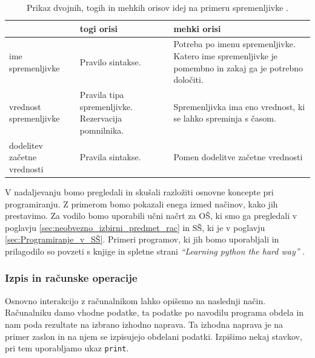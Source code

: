\begin{table}[!h]

\caption{Prikaz dvojnih, togih in mehkih orisov idej na primeru
  spremenljivke \cite{guideTCS}. }
\label{tab:koncept_spremenljivka}
\begin{tabular}{
  | p{} |
  p{} |
  p{} | }
  \hline
  \rowcolor{sbase01!100}
  & \textbf{togi orisi} & \textbf{mehki orisi}\\
  \hline
  ime spremenljivke & Pravilo sintakse. & Potreba po imenu
                                          spremenljivke. Katero ime
                                          spremenljivke je pomembno in
                                          zakaj ga je potrebno
                                          določiti.\\
  \hline
  vrednost spremenljivke & Pravila tipa spremenljivke. Rezervacija
                           pomnilnika. & Spremenljivka ima eno
                                         vrednost, ki se lahko
                                         spreminja s časom.\\
  \hline
  dodelitev začetne vrednosti & Pravila sintakse. & Pomen dodelitve
                                                  začetne vrednosti\\
  \hline

\end{tabular}
\end{table}

V nadaljevanju bomo pregledali in skušali razložiti osnovne koncepte
pri programiranju. Z primerom bomo pokazali enega izmed načinov, kako
jih prestavimo. Za vodilo bomo uporabili učni načrt za OŠ, ki smo ga
pregledali v poglavju \ref{sec:neobvezno_izbirni_predmet_rac} in SŠ,
ki je v poglavju \ref{sec:Programiranje_v_SŠ}. Primeri programov, ki
jih bomo uporabljali in prilagodilo so povzeti s knjige in spletne
strani \emph{``Learning python the hard way''} \cite{web:PTHardWay}.


\subsubsection{Izpis in računske operacije}
\label{sec:izpis_rac_operacije}

Osnovno interakcijo z računalnikom lahko opišemo na naslednji
način. Računalniku damo vhodne podatke, ta podatke po navodilu
programa obdela in nam poda rezultate na izbrano izhodno naprava. Ta
izhodna naprava je na primer zaslon in na njem se izpisujejo obdelani
podatki. Izpišimo nekaj stavkov, pri tem uporabljamo ukaz
\texttt{print}.

